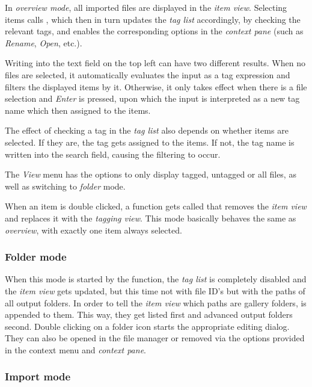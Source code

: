 In \emph{overview mode}, all imported files are displayed in the \emph{item view}. Selecting items calls , which then in turn updates the \emph{tag list} accordingly, by checking the relevant tags, and enables the corresponding options in the \emph{context pane} (such as \emph{Rename}, \emph{Open}, etc.). 

Writing into the text field on the top left can have two different results. When no files are selected, it automatically evaluates the input as a tag expression and filters the displayed items by it. Otherwise, it only takes effect when there is a file selection and \emph{Enter} is pressed, upon which the input is interpreted as  a new tag name which then assigned to the items. 

The effect of checking a tag in the \emph{tag list} also depends on whether items are selected. If they are, the tag gets assigned to the items. If not, the tag name is written into the search field, causing the filtering to occur.

The \emph{View} menu has the options to only display tagged, untagged or all files, as well as switching to \emph{folder} mode.

When an item is double clicked, a function gets called that removes the \emph{item view} and replaces it with the \emph{tagging view}. This mode basically behaves the same as \emph{overview}, with exactly one item always selected.

\subsubsection{Folder mode}
When this mode is started by the  function, the \emph{tag list} is completely disabled and the \emph{item view} gets updated, but this time not with file ID's but with the paths of all output folders. In order to tell the \emph{item view} which paths are gallery folders,  is appended to them. This way, they get listed first and advanced output folders second. Double clicking on a folder icon starts the appropriate editing dialog. They can also be opened in the file manager or removed via the options provided in the context menu and \emph{context pane}.

\subsubsection{Import mode}

